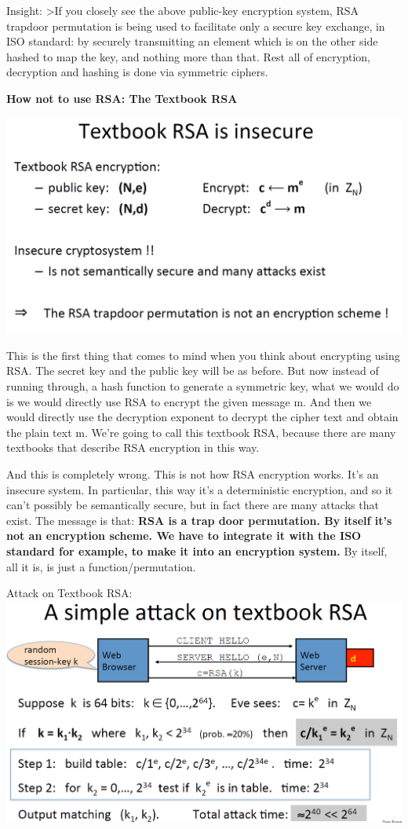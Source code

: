 \documentclass[11pt]{article}
\makeatletter
\def\maxwidth{\ifdim\Gin@nat@width>\linewidth\linewidth
    \else\Gin@nat@width\fi}
\let\Oldincludegraphics\includegraphics
\renewcommand{\includegraphics}[1]{\Oldincludegraphics[width=.8\maxwidth]{#1}}
\makeatother
\begin{document}
Insight: \textgreater{}If you closely see the above public-key
encryption system, RSA trapdoor permutation is being used to facilitate
only a secure key exchange, in ISO standard: by securely transmitting an
element which is on the other side hashed to map the key, and nothing
more than that. Rest all of encryption, decryption and hashing is done
via symmetric ciphers.

\textbf{How not to use RSA: The Textbook RSA}

\includegraphics{./Images/TextBookRSA.png}

This is the first thing that comes to mind when you think about
encrypting using RSA. The secret key and the public key will be as
before. But now instead of running through, a hash function to generate
a symmetric key, what we would do is we would directly use RSA to
encrypt the given message m. And then we would directly use the
decryption exponent to decrypt the cipher text and obtain the plain text
m. We're going to call this textbook RSA, because there are many
textbooks that describe RSA encryption in this way.

And this is completely wrong. This is not how RSA encryption works. It's
an insecure system. In particular, this way it's a deterministic
encryption, and so it can't possibly be semantically secure, but in fact
there are many attacks that exist. The message is that: \textbf{RSA is a
trap door permutation. By itself it's not an encryption scheme. We have
to integrate it with the ISO standard for example, to make it into an
encryption system.} By itself, all it is, is just a
function/permutation.

Attack on Textbook RSA:
\includegraphics{./Images/AttackOnTextBookRSA.png}
\end{document}
